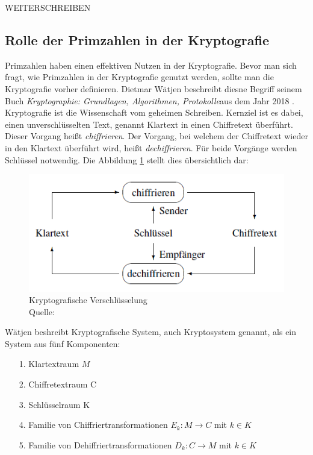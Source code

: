 WEITERSCHREIBEN

\subsection{Rolle der Primzahlen in der Kryptografie}
Primzahlen haben einen effektiven Nutzen in der Kryptografie. Bevor man sich fragt, wie Primzahlen in der Kryptografie genutzt werden, sollte man die Kryptografie vorher definieren. Dietmar Wätjen beschreibt diesne Begriff seinem Buch \glqq\textit{Kryptographie: Grundlagen, Algorithmen, Protokolle}\grqq aus dem Jahr 2018 \cite[vgl.][S. 1]{Watjen.2018}. Kryptografie ist die Wissenschaft vom geheimen Schreiben. Kernziel ist es dabei, einen unverschlüsselten Text, genannt Klartext in einen Chiffretext überführt. Dieser Vorgang heißt \textit{chiffrieren}. Der Vorgang, bei welchem der Chiffretext wieder in den Klartext überführt wird, heißt \textit{dechiffrieren}. Für beide Vorgänge werden Schlüssel notwendig. Die Abbildung \ref{fig:verschluesselung} stellt dies übersichtlich dar:

\begin{figure}[!h]
    \centering
    \includegraphics[width=\textwidth]{grafiken/verschluesselung.png}
    \caption[Kryptografische Verschlüsselung]{Kryptografische Verschlüsselung \\ Quelle: \cite{Watjen.2018}}
    \label{fig:verschluesselung}
\end{figure}

Wätjen beshreibt Kryptografische System, auch Kryptosystem genannt, als ein System aus fünf Komponenten:

\begin{itemize}
\item[ 1. ]  Klartextraum $M$
\item[ 2. ]  Chiffretextraum C
\item[ 3. ]  Schlüsselraum K
\item[ 4. ]  Familie von Chiffriertransformationen $E_k:M \rightarrow C$ mit $k \in K$
\item[ 5. ]  Familie von Dehiffriertransformationen $D_k:C \rightarrow M$ mit $k \in K$
\end{itemize}

